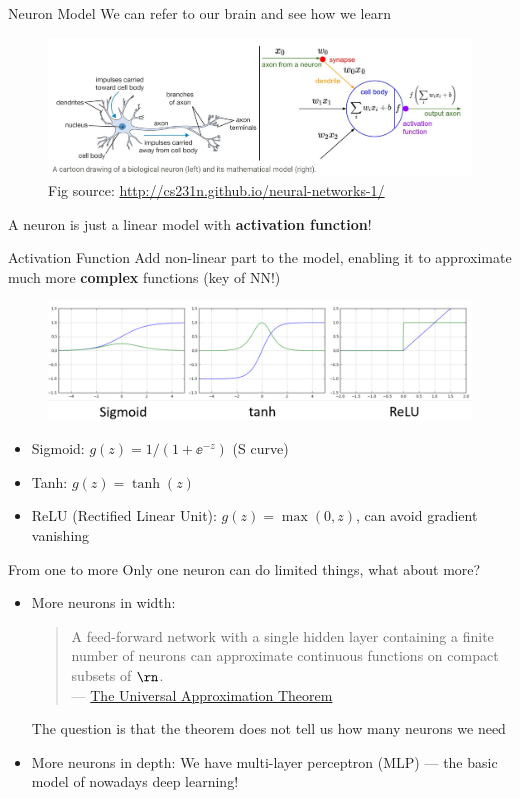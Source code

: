 \documentclass{../TexTemplate/myslide}
\begin{document}
\begin{frame}{Neuron Model}
We can refer to our brain and see how we learn
\begin{figure}[H]
\centering
\includegraphics[width=\linewidth]{fig/neuron_model.png}
\caption*{\small Fig source: \url{http://cs231n.github.io/neural-networks-1/}}
\end{figure}
\pause
A neuron is just a linear model with \textbf{activation function}!
\end{frame}

\begin{frame}{Activation Function}
Add non-linear part to the model, enabling it to approximate much more \textbf{complex} functions (key of NN!)
\begin{figure}
\centering
\includegraphics[width=0.8\linewidth]{fig/activation_function.png}
\end{figure}
\begin{itemize}
	\item Sigmoid: $g(z)=1/(1+\ee^{-z})$ (S curve)
	\item Tanh: $g(z)=\tanh(z)$
	\item ReLU (Rectified Linear Unit): $g(z)=\max(0,z)$, can avoid gradient vanishing
\end{itemize}
\end{frame}

\begin{frame}{From one to more}
Only one neuron can do limited things, what about more?
\begin{itemize}
	\item More neurons in width:\vspace{3pt}
	\begin{quote}
	A feed-forward network with a single hidden layer containing a finite number of neurons can approximate continuous functions on compact subsets of $\rn$.\\
	\hfill --- \href{https://en.wikipedia.org/wiki/Universal_approximation_theorem}{The Universal Approximation Theorem}
	\end{quote}
	The question is that the theorem does not tell us how many neurons we need
	\pause
	\item More neurons in depth: We have multi-layer perceptron (MLP) --- the basic model of nowadays deep learning!
\end{itemize}
\end{frame}
\end{document}
